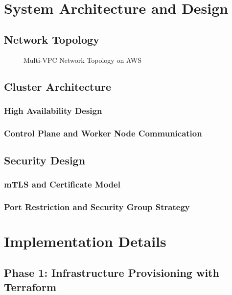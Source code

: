 \documentclass[12pt]{article}
\begin{document}
\section{System Architecture and Design}
\subsection{Network Topology}
\begin{figure}[H]
    \centering
    \caption{Multi-VPC Network Topology on AWS}
    \label{fig:network-topology}
\end{figure}

\subsection{Cluster Architecture}
\subsubsection{High Availability Design}
\subsubsection{Control Plane and Worker Node Communication}

\subsection{Security Design}
\subsubsection{mTLS and Certificate Model}
\subsubsection{Port Restriction and Security Group Strategy}

\section{Implementation Details}
\subsection{Phase 1: Infrastructure Provisioning with Terraform}
\end{document}
